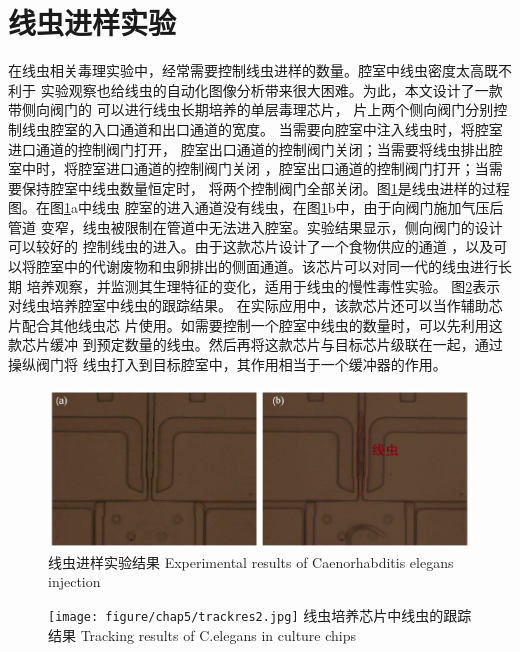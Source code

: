 \section{线虫进样实验}
	在线虫相关毒理实验中，经常需要控制线虫进样的数量。腔室中线虫密度太高既不利于
	实验观察也给线虫的自动化图像分析带来很大困难。为此，本文设计了一款带侧向阀门的
	可以进行线虫长期培养的单层毒理芯片，
	片上两个侧向阀门分别控制线虫腔室的入口通道和出口通道的宽度。
	当需要向腔室中注入线虫时，将腔室进口通道的控制阀门打开，
	腔室出口通道的控制阀门关闭；当需要将线虫排出腔室中时，将腔室进口通道的控制阀门关闭
	，腔室出口通道的控制阀门打开；当需要保持腔室中线虫数量恒定时，
	将两个控制阀门全部关闭。图\ref{fig:chap5:worms}是线虫进样的过程图。在图\ref{fig:chap5:worms}a中线虫
	腔室的进入通道没有线虫，在图\ref{fig:chap5:worms}b中，由于向阀门施加气压后管道
	变窄，线虫被限制在管道中无法进入腔室。实验结果显示，侧向阀门的设计可以较好的
	控制线虫的进入。由于这款芯片设计了一个食物供应的通道
	，以及可以将腔室中的代谢废物和虫卵排出的侧面通道。该芯片可以对同一代的线虫进行长期
	培养观察，并监测其生理特征的变化，适用于线虫的慢性毒性实验。
	图\ref{fig:chap5:tracking2}表示对线虫培养腔室中线虫的跟踪结果。
	在实际应用中，该款芯片还可以当作辅助芯片配合其他线虫芯
	片使用。如需要控制一个腔室中线虫的数量时，可以先利用这款芯片缓冲
	到预定数量的线虫。然后再将这款芯片与目标芯片级联在一起，通过操纵阀门将
	线虫打入到目标腔室中，其作用相当于一个缓冲器的作用。
	\begin{figure}[!h]
	  \centering
	  \includegraphics[width=15cm]{figure/chap5/valve.jpg}
	  \bicaption
		{线虫进样实验结果}
		{Experimental results of Caenorhabditis elegans injection}
	  \label{fig:chap5:worms}
	\end{figure}
	
	\begin{figure}[!h]
	  \centering
	  \texttt{[image: figure/chap5/trackres2.jpg]}
	  \bicaption
		{线虫培养芯片中线虫的跟踪结果}
		{Tracking results of C.elegans in culture chips}
	  \label{fig:chap5:tracking2}
	\end{figure}
\newpage
